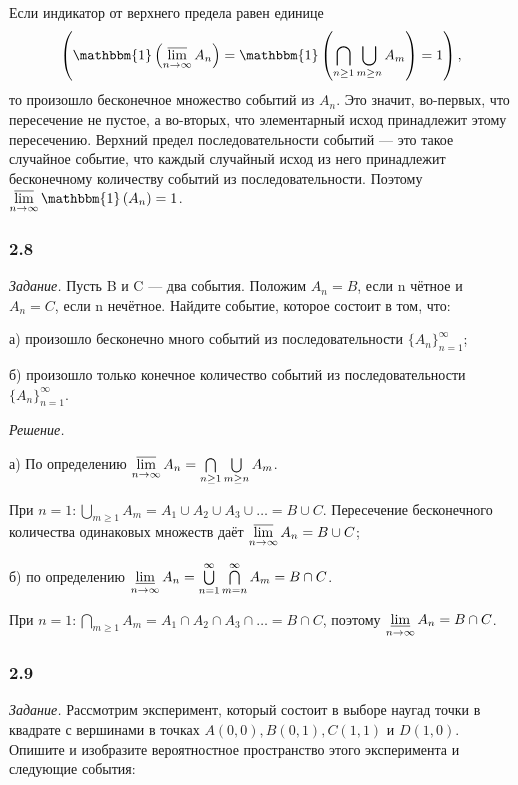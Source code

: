 \documentclass{book}
\begin{document}
Если индикатор от верхнего предела равен единице
$$ \left( \mathbbm{ 1 } \left( \varlimsup \limits_{ n \to \infty } A_n \right) =
\mathbbm{ 1 } \left( \bigcap \limits_{ n \geq 1} \bigcup \limits_{ m \geq n } A_m \right) =
1 \right) ,$$
то произошло бесконечное множество событий из $A_n$.
Это значит, во-первых, что пересечение не пустое, а во-вторых, что элементарный исход принадлежит этому пересечению.
Верхний предел последовательности событий --- это такое случайное событие,
что каждый случайный исход из него принадлежит бесконечному количеству событий из последовательности.
Поэтому
$ \varlimsup \limits_{ n \to \infty } \mathbbm{ 1 } \left( A_n \right) = 1 $.

\subsubsection*{2.8}

\textit{Задание.} Пусть B и C --- два события.
Положим $ A_n = B $, если n чётное и $ A_n = C $, если n нечётное.
Найдите событие, которое состоит в том, что:

а) произошло бесконечно много событий из последовательности $ \{ A_n \}_{ n = 1 }^\infty $;

б) произошло только конечное количество событий из последовательности $ \{ A_n \}_{ n = 1 }^\infty $.

\textit{Решение.}

а) По определению $ \varlimsup \limits_{ n \to \infty } A_n = \bigcap \limits_{ n \geq 1} \bigcup \limits_{ m \geq n} A_m $.

При $ n = 1: \bigcup \limits_{ m \geq 1} A_m = A_1 \cup A_2 \cup A_3 \cup \dotsc = B \cup C $.
Пересечение бесконечного количества одинаковых множеств даёт $ \varlimsup \limits_{ n \to \infty } A_n = B \cup C $;

б) по определению $ \varliminf \limits_{ n \to \infty } A_n = \bigcup \limits_{ n = 1 }^\infty \bigcap \limits_{ m = n }^\infty A_m = B \cap C $.

При $ n = 1 : \bigcap \limits_{ m \geq 1 } A_m = A_1 \cap A_2 \cap A_3 \cap \dotsc = B \cap C $, поэтому $ \varliminf \limits_{ n \to \infty } A_n = B \cap C $.

\subsubsection*{2.9}

\textit{Задание.} Рассмотрим эксперимент, который состоит в выборе наугад точки в квадрате с вершинами в точках $ A(0, 0), B(0, 1), C(1, 1) $ и $ D(1, 0) $.
Опишите и изобразите вероятностное пространство этого эксперимента и следующие события:
\end{document}
